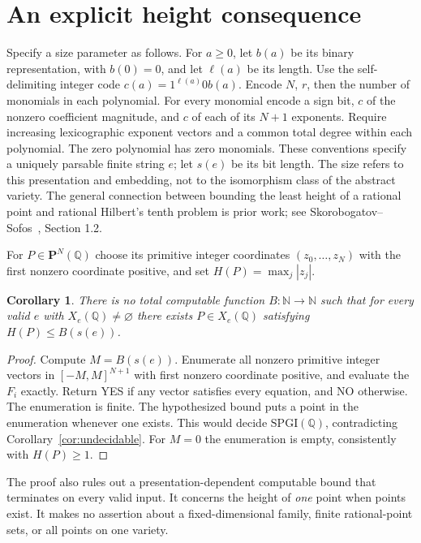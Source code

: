 \documentclass[11pt]{article}
\newtheorem{corollary}[theorem]{Corollary}
\newcommand{\Q}{\mathbb Q}
\begin{document}
\section{An explicit height consequence}
Specify a size parameter as follows. For $a\geq0$, let $b(a)$ be its binary
representation, with $b(0)=0$, and let $\ell(a)$ be its length. Use the
self-delimiting integer code $c(a)=1^{\ell(a)}0b(a)$.
Encode $N$, $r$, then the number of monomials in each polynomial. For every
monomial encode a sign bit, $c$ of the nonzero coefficient magnitude,
and $c$ of each of its $N+1$ exponents. Require increasing lexicographic
exponent vectors and a common total degree within each polynomial.
The zero polynomial has zero monomials. These conventions specify a
uniquely parsable finite string $e$; let $s(e)$ be its bit length.
The size refers to this presentation and embedding, not to the isomorphism
class of the abstract variety.
The general connection between bounding the least height of a rational
point and rational Hilbert's tenth problem is prior work; see
Skorobogatov--Sofos~\cite{SkorobogatovSofos}, Section 1.2.

For $P\in\mathbf P^N(\Q)$ choose its primitive integer coordinates
$(z_0,\ldots,z_N)$ with the first nonzero coordinate positive, and set
$H(P)=\max_j|z_j|$.

\begin{corollary}
There is no total computable
function $B:\mathbb N\to\mathbb N$ such that for every valid $e$ with
$X_e(\Q)\ne\varnothing$ there exists $P\in X_e(\Q)$ satisfying
$H(P)\leq B(s(e))$.
\end{corollary}
\begin{proof}
Compute $M=B(s(e))$. Enumerate all nonzero primitive integer vectors in
$[-M,M]^{N+1}$ with first nonzero coordinate positive, and evaluate the
$F_i$ exactly. Return YES if any vector satisfies every equation, and NO
otherwise. The enumeration is finite. The hypothesized bound puts a point
in the enumeration whenever one exists. This would decide
$\mathrm{SPGI}(\Q)$, contradicting Corollary~\ref{cor:undecidable}.
For $M=0$ the enumeration is empty, consistently with $H(P)\geq1$.
\end{proof}

The proof also rules out a presentation-dependent computable bound that
terminates on every valid input. It concerns the height of \emph{one} point
when points exist. It makes no assertion about a fixed-dimensional family,
finite rational-point sets, or all points on one variety.
\end{document}
